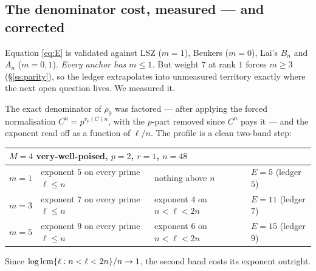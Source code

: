 \subsection{The denominator cost, measured --- and corrected}\label{ss:Emeasured}

Equation \eqref{eq:E} is validated against LSZ ($m=1$), Beukers ($m=0$), Lai's $B_n$ and
$A_n$ ($m=0,1$). \emph{Every anchor has $m\le1$.} But weight $7$ at rank $1$ forces $m\ge3$
(\S\ref{ss:parity}), so the ledger extrapolates into unmeasured territory exactly where the
next open question lives. We measured it.

The exact denominator of $\rho_0$ was factored --- after applying the forced normalisation
$C^n=p^{v_p(C)n}$, with the $p$-part removed since $C^n$ pays it --- and the exponent read
off as a function of $\ell/n$. The profile is a clean two-band step:
\begin{center}
\tabsmall
\begin{tabular}{llll}
\toprule
\multicolumn{4}{l}{$M=4$ very-well-poised, $p=2$, $r=1$, $n=48$}\\
\midrule
$m=1$ & exponent $5$ on every prime $\ell\le n$ & nothing above $n$ & $E=5$ (ledger $5$)\\
$m=3$ & exponent $7$ on every prime $\ell\le n$ & exponent $4$ on $n<\ell<2n$ & $E=11$ (ledger $7$)\\
$m=5$ & exponent $9$ on every prime $\ell\le n$ & exponent $6$ on $n<\ell<2n$ & $E=15$ (ledger $9$)\\
\bottomrule
\end{tabular}
\end{center}
Since $\log\operatorname{lcm}\{\ell:n<\ell<2n\}/n\to1$, the second band costs its exponent outright.

